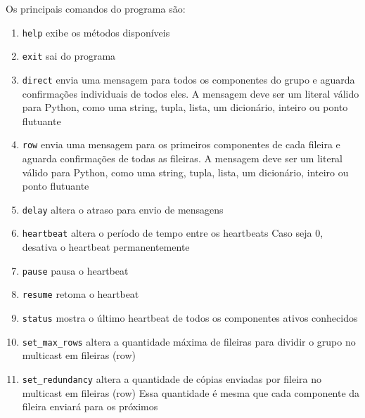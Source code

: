 \documentclass[12pt,twocolumn]{article}
\begin{document}
			Os principais comandos do programa são: 
			\begin{enumerate}
				\item \texttt{help} exibe os métodos disponíveis
				
				\item \texttt{exit} sai do programa
				
				\item \texttt{direct} envia uma mensagem para todos os componentes do grupo e aguarda confirmações individuais de todos eles.
				A mensagem deve ser um literal válido para Python, como uma string, tupla, lista, um dicionário, inteiro ou ponto flutuante
				
				\item \texttt{row} envia uma mensagem para os primeiros componentes de cada fileira e aguarda confirmações de todas as fileiras.
				A mensagem deve ser um literal válido para Python, como uma string, tupla, lista, um dicionário, inteiro ou ponto flutuante
				
				\item \texttt{delay} altera o atraso para envio de mensagens
				
				\item \texttt{heartbeat} altera o período de tempo entre os heartbeats
				Caso seja 0, desativa o heartbeat permanentemente
				
				\item \texttt{pause}  pausa o heartbeat
				
				\item \texttt{resume}  retoma o heartbeat 
				
				\item \texttt{status}  mostra o último heartbeat de todos os componentes ativos conhecidos 
				
				\item \texttt{set\_max\_rows}  altera a quantidade máxima de fileiras para dividir o grupo no multicast em fileiras (row)
				
				\item \texttt{set\_redundancy}  altera a quantidade de cópias enviadas por fileira no multicast em fileiras (row)
				Essa quantidade é mesma que cada componente da fileira enviará para os próximos 								
				
			\end{enumerate}
			
				
\end{document}

